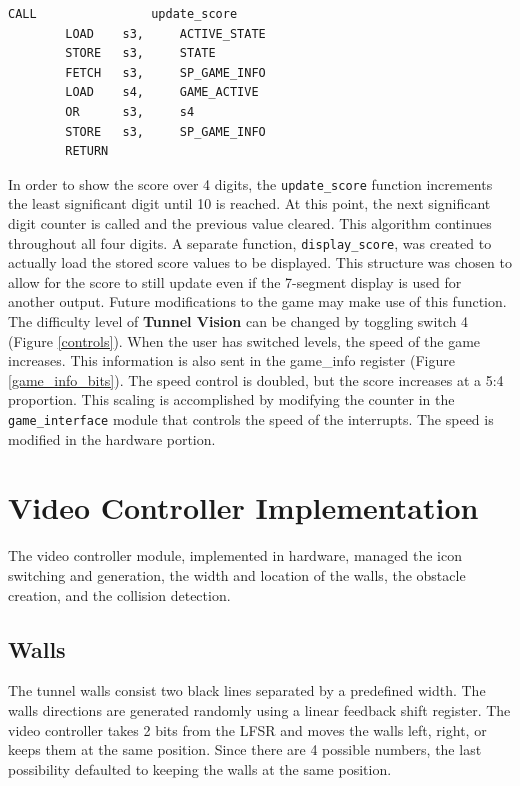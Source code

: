 \documentclass[11pt]{article}
\begin{document}
\vspace{12pt}

\begin{lstlisting}[caption=Update the state and game info, label=active]		
		CALL				update_score				
		LOAD 	s3,		ACTIVE_STATE
		STORE	s3,		STATE
		FETCH	s3,		SP_GAME_INFO
		LOAD 	s4,		GAME_ACTIVE
		OR		s3,		s4					
		STORE	s3,		SP_GAME_INFO
		RETURN
 \end{lstlisting}


\hspace{16pt}In order to show the score over 4 digits, the \texttt{update\_score} function increments the least significant digit until 10 is reached.  At this point, the next significant digit counter is called and the previous value cleared.  This algorithm continues throughout all four digits. A separate function, \texttt{display\_score}, was created to actually load the stored score values to be displayed.  This structure was chosen to allow for the score to still update even if the 7-segment display is used for another output.  Future modifications to the game may make use of this function.\\		

\hspace{16pt} The difficulty level of \textbf{Tunnel Vision} can be changed by toggling switch 4 (Figure \ref{controls}). When the user has switched levels, the speed of the game increases.  This information is also sent in the game\_info register (Figure \ref{game_info_bits}).  The speed control is doubled, but the score increases at a 5:4 proportion.  This scaling is accomplished by modifying the counter in the \texttt{game\_interface} module that controls the speed of the interrupts. The speed is modified in the hardware portion.\\

	
\section{Video Controller Implementation}
	The video controller module, implemented in hardware, managed the icon switching and generation, the width and location of the walls, the obstacle creation, and the collision detection.
	
	


\subsection{Walls}
The tunnel walls consist two black lines separated by a predefined width.  The walls directions are generated randomly using a linear feedback shift register. The video controller takes 2 bits from the LFSR and moves the walls left, right, or keeps them at the same position.  Since there are 4 possible numbers, the last possibility defaulted to keeping the walls at the same position.  \\
\end{document}
